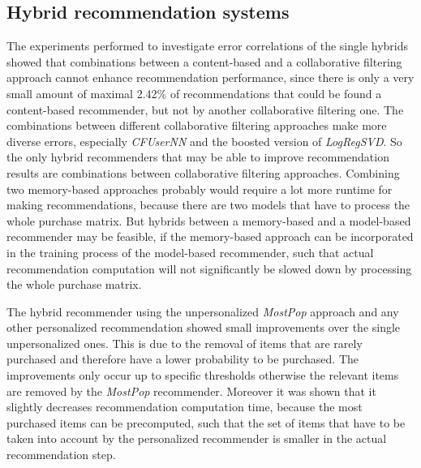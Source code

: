 \documentclass[10pt]{reportMaster}
\begin{document}
\subsection{Hybrid recommendation systems}
\label{sec:discHybrid}
The experiments performed to investigate error correlations of the single hybrids showed that combinations between a content-based and a collaborative filtering approach cannot enhance recommendation performance, since there is only a very small amount of maximal 2.42\% of recommendations that could be found a content-based recommender, but not by another collaborative filtering one.
The combinations between different collaborative filtering approaches make more diverse errors, especially \textit{CFUserNN} and the boosted version of \textit{LogRegSVD}.
So the only hybrid recommenders that may be able to improve recommendation results are combinations between collaborative filtering  approaches.
Combining two memory-based approaches probably would require a lot more runtime for making recommendations, because there are two models that have to process the whole purchase matrix.
But hybrids between a memory-based and a model-based recommender may be feasible, if the memory-based approach can be incorporated in the training process of the model-based recommender, such that actual recommendation computation will not significantly be slowed down by processing the whole purchase matrix. %

The hybrid recommender using the unpersonalized \textit{MostPop} approach and any other personalized recommendation showed small improvements over the single unpersonalized ones.
This is due to the removal of items that are rarely purchased and therefore have a lower probability to be purchased.
The improvements only occur up to specific thresholds otherwise the relevant items are removed by the \textit{MostPop} recommender.
Moreover it was shown that it slightly decreases recommendation computation time, because the most purchased items can be precomputed, such that the set of items that have to be taken into account by the personalized recommender is smaller in the actual recommendation step.




\end{document}
